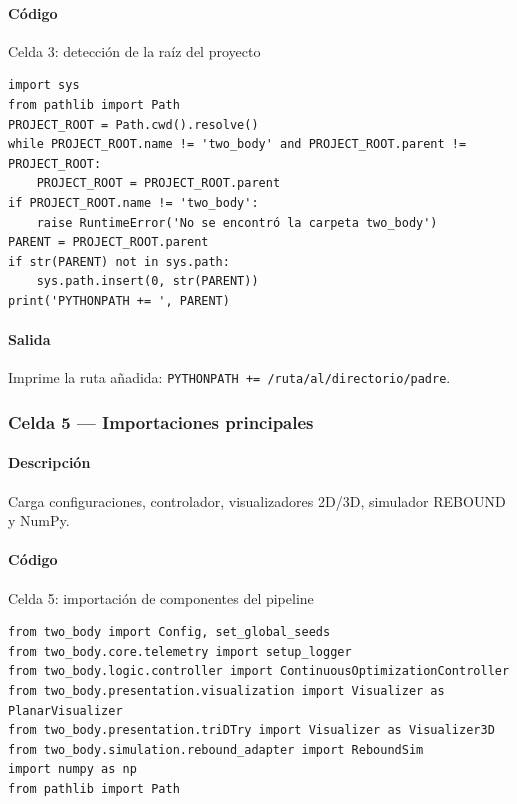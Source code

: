 \paragraph{Código}
\begin{listing}[H]
\caption{Celda 3: detección de la raíz del proyecto}
\begin{adjustbox}{max width=\textwidth}
\begin{minipage}{\textwidth}
\begin{verbatim}
import sys
from pathlib import Path
PROJECT_ROOT = Path.cwd().resolve()
while PROJECT_ROOT.name != 'two_body' and PROJECT_ROOT.parent != PROJECT_ROOT:
    PROJECT_ROOT = PROJECT_ROOT.parent
if PROJECT_ROOT.name != 'two_body':
    raise RuntimeError('No se encontró la carpeta two_body')
PARENT = PROJECT_ROOT.parent
if str(PARENT) not in sys.path:
    sys.path.insert(0, str(PARENT))
print('PYTHONPATH += ', PARENT)
\end{verbatim}
\end{minipage}
\end{adjustbox}
\end{listing}
\paragraph{Salida} Imprime la ruta añadida: \texttt{PYTHONPATH += /ruta/al/directorio/padre}.

\subsubsection*{Celda 5 — Importaciones principales}
\paragraph{Descripción} Carga configuraciones, controlador, visualizadores 2D/3D, simulador REBOUND y NumPy.
\paragraph{Código}
\begin{listing}[H]
\caption{Celda 5: importación de componentes del pipeline}
\begin{adjustbox}{max width=\textwidth}
\begin{minipage}{\textwidth}
\begin{verbatim}
from two_body import Config, set_global_seeds
from two_body.core.telemetry import setup_logger
from two_body.logic.controller import ContinuousOptimizationController
from two_body.presentation.visualization import Visualizer as PlanarVisualizer
from two_body.presentation.triDTry import Visualizer as Visualizer3D
from two_body.simulation.rebound_adapter import ReboundSim
import numpy as np
from pathlib import Path
\end{verbatim}
\end{minipage}
\end{adjustbox}
\end{listing}
